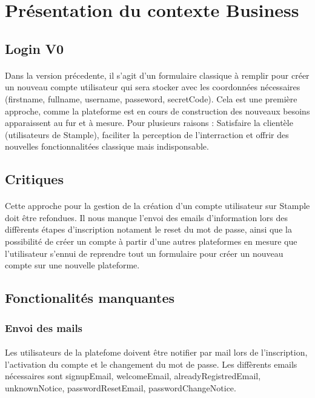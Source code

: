 \section{Présentation du contexte Business}
\subsection{Login V0}
\paragraph{}
Dans la version précedente, il s'agit d'un formulaire classique à remplir pour créer un nouveau compte utilisateur qui sera stocker avec les coordonnées nécessaires (firstname, fullname, username, passeword, secretCode).
Cela est une première approche, comme la plateforme est en cours de construction des nouveaux besoins apparaissent au fur et à mesure.
Pour plusieurs raisons : Satisfaire la clientèle (utilisateurs de Stample), faciliter la perception de l'interraction et offrir des nouvelles fonctionnalitées classique mais indisponsable.  
\subsection{Critiques}
\paragraph{}
Cette approche pour la gestion de la création d'un compte utilisateur sur Stample doit être refondues.
Il nous manque l'envoi des emails d'information lors des diffèrents étapes d'inscription notament le reset du mot de passe, ainsi que la possibilité de créer un compte à partir d'une autres plateformes en mesure que l'utilisateur s'ennui de reprendre tout un formulaire pour créer un nouveau compte sur une nouvelle plateforme.
\subsection{Fonctionalités manquantes}
\subsubsection{Envoi des mails}
\paragraph{}
Les utilisateurs de la platefome doivent être notifier par mail lors de l'inscription, l'activation du compte et le changement du mot de passe. 
Les diffèrents emails nécessaires sont signupEmail, welcomeEmail, alreadyRegistredEmail, unknownNotice, passwordResetEmail, passwordChangeNotice.
